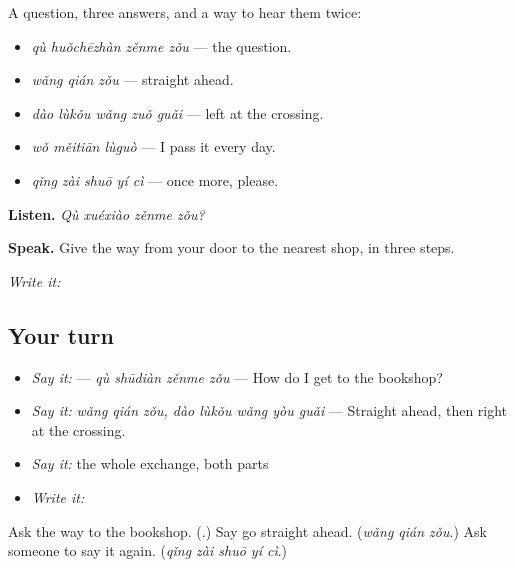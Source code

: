 \begin{grammarlens}[title={What you've built — asking the way, and following it}]
A question, three answers, and a way to hear them twice:

\begin{itemize}
\raggedright
  \item \textbf{} \emph{qù huǒchēzhàn zěnme zǒu} — the question.
  \item \emph{wǎng qián zǒu} — straight ahead.
  \item \emph{dào lùkǒu wǎng zuǒ guǎi} — left at the crossing.
  \item \textbf{} \emph{wǒ měitiān lùguò} — I pass it every day.
  \item \emph{qǐng zài shuō yí cì} — once more, please.
\end{itemize}

\textbf{Listen.} \emph{Qù xuéxiào zěnme zǒu?}

\textbf{Speak.} Give the way from your door to the nearest shop, in three steps.

\emph{Write it:} 
\end{grammarlens}

\subsection*{Your turn}
\begin{itemize}
\raggedright
  \item \emph{Say it:}  — \emph{qù shūdiàn zěnme zǒu} — How do I get to the bookshop?
  \item \emph{Say it:} \emph{wǎng qián zǒu, dào lùkǒu wǎng yòu guǎi} — Straight ahead, then right at the crossing.
  \item \emph{Say it:} the whole exchange, both parts
  \item \emph{Write it:} 
\end{itemize}

\begin{tcolorbox}[breakable,colback=teal!4,colframe=teal!35!black,title={Before you move on}]
Ask the way to the bookshop. (\textbf{}.) Say go straight ahead. (\emph{wǎng qián zǒu}.) Ask someone to say it again. (\emph{qǐng zài shuō yí cì}.)
\end{tcolorbox}
